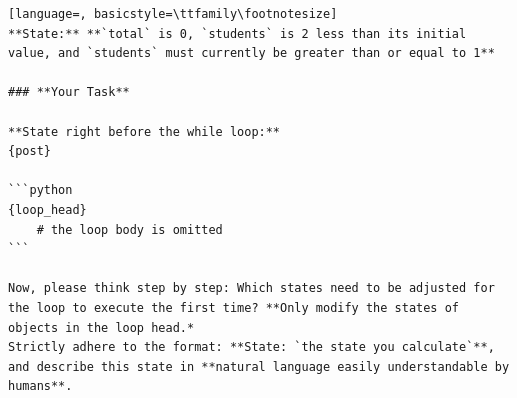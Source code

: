 \documentclass[sigconf]{acmart}
\begin{document}
\begin{tcolorbox}[ colback=gray!10, colframe=black, arc=5pt]
\begin{lstlisting}[language=, basicstyle=\ttfamily\footnotesize]
**State:** **`total` is 0, `students` is 2 less than its initial value, and `students` must currently be greater than or equal to 1**

### **Your Task**

**State right before the while loop:**  
{post}

```python
{loop_head}
    # the loop body is omitted
```

Now, please think step by step: Which states need to be adjusted for the loop to execute the first time? **Only modify the states of objects in the loop head.*
Strictly adhere to the format: **State: `the state you calculate`**, and describe this state in **natural language easily understandable by humans**.

\end{lstlisting}
\end{tcolorbox}
\end{document}
